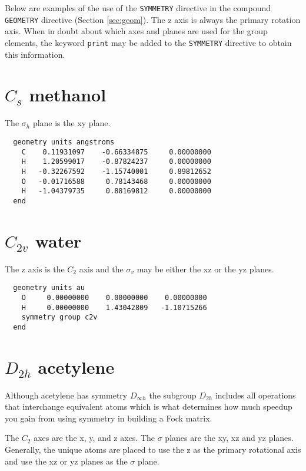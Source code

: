\label{symexamples}

Below are examples of the use of the \verb+SYMMETRY+ directive in
the compound \verb+GEOMETRY+ directive (Section \ref{sec:geom}).
The z axis is always the primary rotation axis.
When in doubt about which axes and planes are used for the group
elements, the keyword \verb+print+ may be added to the \verb+SYMMETRY+ 
directive to obtain this information.

  \section{\protect$C_{s}$ methanol}

The $\sigma_h$ plane is the xy plane.

\begin{verbatim}
  geometry units angstroms
    C    0.11931097    -0.66334875     0.00000000
    H    1.20599017    -0.87824237     0.00000000
    H   -0.32267592    -1.15740001     0.89812652
    O   -0.01716588     0.78143468     0.00000000
    H   -1.04379735     0.88169812     0.00000000
  end
\end{verbatim}

  \section{\protect$C_{2v}$ water}

The z axis is the $C_2$ axis and the $\sigma_v$ may be either the xz or the
yz planes.

\begin{verbatim}
  geometry units au
    O     0.00000000    0.00000000    0.00000000
    H     0.00000000    1.43042809   -1.10715266
    symmetry group c2v
  end
\end{verbatim}

  \section{\protect$D_{2h}$ acetylene}

Although acetylene has symmetry $D_{\infty h}$ the subgroup
$D_{2h}$ includes all operations that interchange equivalent atoms
which is what determines how much speedup you gain from using symmetry
in building a Fock matrix.

The $C_2$ axes are the x, y, and z axes.  The $\sigma$ planes are the xy,
xz and yz planes.  Generally, the unique atoms are placed to use the z
as the primary rotational axis and use the xz or yz planes as the $\sigma$ 
plane.

